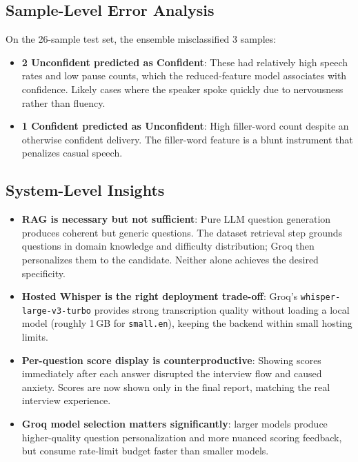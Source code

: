 \documentclass[12pt,a4paper]{article}
\begin{document}
\subsection{Sample-Level Error Analysis}

On the 26-sample test set, the ensemble misclassified 3 samples:
\begin{itemize}[leftmargin=1.5em]
  \item \textbf{2 Unconfident predicted as Confident}: These had relatively high speech rates and low pause counts, which the reduced-feature model associates with confidence. Likely cases where the speaker spoke quickly due to nervousness rather than fluency.
  \item \textbf{1 Confident predicted as Unconfident}: High filler-word count despite an otherwise confident delivery. The filler-word feature is a blunt instrument that penalizes casual speech.
\end{itemize}

\subsection{System-Level Insights}

\begin{itemize}[leftmargin=1.5em]
  \item \textbf{RAG is necessary but not sufficient}: Pure LLM question generation produces coherent but generic questions. The dataset retrieval step grounds questions in domain knowledge and difficulty distribution; Groq then personalizes them to the candidate. Neither alone achieves the desired specificity.
  \item \textbf{Hosted Whisper is the right deployment trade-off}: Groq's \texttt{whisper-large-v3-turbo} provides strong transcription quality without loading a local model (roughly 1\,GB for \texttt{small.en}), keeping the backend within small hosting limits.
  \item \textbf{Per-question score display is counterproductive}: Showing scores immediately after each answer disrupted the interview flow and caused anxiety. Scores are now shown only in the final report, matching the real interview experience.
  \item \textbf{Groq model selection matters significantly}: larger models produce higher-quality question personalization and more nuanced scoring feedback, but consume rate-limit budget faster than smaller models.
\end{itemize}
\end{document}
